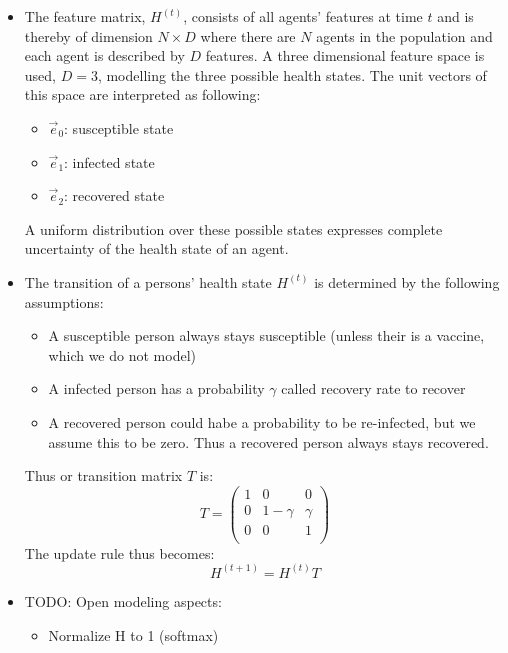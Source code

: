 \documentclass[]{article}
\begin{document}
\begin{itemize}
\begin{itemize}
	\end{itemize}
	\item The feature matrix, $H^{(t)}$, consists of all agents' features at time $t$ and is thereby of dimension $N\times D$ where there are $N$ agents in the population and each agent is described by $D$ features. A three dimensional feature space is used, $D=3$, modelling the three possible health states. The unit vectors of this space are interpreted as following:
	\begin{itemize}
		\item $\vec{e}_0$: susceptible state
		\item $\vec{e}_1$: infected state
		\item $\vec{e}_2$: recovered state
	\end{itemize}
	A uniform distribution over these possible states expresses complete uncertainty of the health state of an agent.
	\item The transition of a persons' health state $H^{(t)}$ is determined by the following assumptions:
	\begin{itemize}
		\item A susceptible person always stays susceptible (unless their is a vaccine, which we do not model)
		\item A infected person has a probability $\gamma$ called recovery rate to recover
		\item A recovered person could habe a probability to be re-infected, but we assume this to be zero. Thus a recovered person always stays recovered.
	\end{itemize}
	Thus or transition matrix $T$ is:
	\begin{equation}
		T = 
		\begin{pmatrix}
			1 &     0    & 0 \\
			0 & 1-\gamma & \gamma \\
			0 &     0    & 1 \\
		\end{pmatrix}
	\end{equation}
	The update rule thus becomes:
	\begin{equation}
		H^{(t+1)} = H^{(t)} T
	\end{equation}

	\item TODO: Open modeling aspects:
	\begin{itemize}
		\item Normalize H to 1 (softmax)
		 
	\end{itemize}
\end{itemize}
\end{document}
